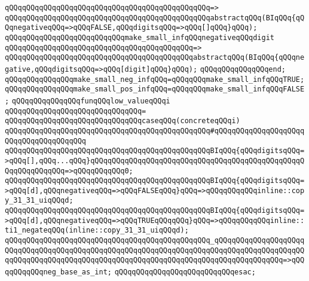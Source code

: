 \verb|qQQqqQQqqQQqqQQqqQQqqQQqqQQqqQQqqQQqqQQqqQQqqQQq=>|\newline
\verb|qQQqqQQqqQQqqQQqqQQqqQQqqQQqqQQqqQQqqQQqqQQqqQQqabstractqQQq(BIqQQq{qQQqnegativeqQQq=>qQQqFALSE,qQQqdigitsqQQq=>qQQq[]qQQq}qQQq);|\newline
\newline
\verb|qQQqqQQqqQQqqQQqqQQqqQQqqQQqmake_small_infqQQqnegativeqQQqdigit|\newline
\verb|qQQqqQQqqQQqqQQqqQQqqQQqqQQqqQQqqQQqqQQqqQQq=>|\newline
\verb|qQQqqQQqqQQqqQQqqQQqqQQqqQQqqQQqqQQqqQQqqQQqabstractqQQq(BIqQQq{qQQqnegative,qQQqdigitsqQQq=>qQQq[digit]qQQq}qQQq);|\newline
\verb|qQQqqQQqqQQqqQQqend;|\newline
\newline
\verb|qQQqqQQqqQQqqQQqmake_small_neg_infqQQq=qQQqqQQqmake_small_infqQQqTRUE;|\newline
\verb|qQQqqQQqqQQqqQQqmake_small_pos_infqQQq=qQQqqQQqmake_small_infqQQqFALSE;|\newline
\newline
\verb|qQQqqQQqqQQqqQQqfunqQQqlow_valueqQQqi|\newline
\verb|qQQqqQQqqQQqqQQqqQQqqQQqqQQqqQQq=|\newline
\verb|qQQqqQQqqQQqqQQqqQQqqQQqqQQqqQQqcaseqQQq(concreteqQQqi)|\newline
\verb|qQQqqQQqqQQqqQQqqQQqqQQqqQQqqQQqqQQqqQQqqQQqqQQq#qQQqqQQqqQQqqQQqqQQqqQQqqQQqqQQqqQQqqQQq|\newline
\verb|qQQqqQQqqQQqqQQqqQQqqQQqqQQqqQQqqQQqqQQqqQQqqQQqBIqQQq{qQQqdigitsqQQq=>qQQq[],qQQq...qQQq}qQQqqQQqqQQqqQQqqQQqqQQqqQQqqQQqqQQqqQQqqQQqqQQqqQQqqQQqqQQqqQQq=>qQQqqQQqqQQq0;|\newline
\verb|qQQqqQQqqQQqqQQqqQQqqQQqqQQqqQQqqQQqqQQqqQQqqQQqBIqQQq{qQQqdigitsqQQq=>qQQq[d],qQQqnegativeqQQq=>qQQqFALSEqQQq}qQQq=>qQQqqQQqqQQqinline::copy_31_31_uiqQQqd;|\newline
\verb|qQQqqQQqqQQqqQQqqQQqqQQqqQQqqQQqqQQqqQQqqQQqqQQqBIqQQq{qQQqdigitsqQQq=>qQQq[d],qQQqnegativeqQQq=>qQQqTRUEqQQqqQQq}qQQq=>qQQqqQQqqQQqinline::ti1_negateqQQq(inline::copy_31_31_uiqQQqd);|\newline
\verb|qQQqqQQqqQQqqQQqqQQqqQQqqQQqqQQqqQQqqQQqqQQqqQQq_qQQqqQQqqQQqqQQqqQQqqQQqqQQqqQQqqQQqqQQqqQQqqQQqqQQqqQQqqQQqqQQqqQQqqQQqqQQqqQQqqQQqqQQqqQQqqQQqqQQqqQQqqQQqqQQqqQQqqQQqqQQqqQQqqQQqqQQqqQQqqQQqqQQqqQQqqQQq=>qQQqqQQqqQQqneg_base_as_int;|\newline
\verb|qQQqqQQqqQQqqQQqqQQqqQQqqQQqesac;|\newline
